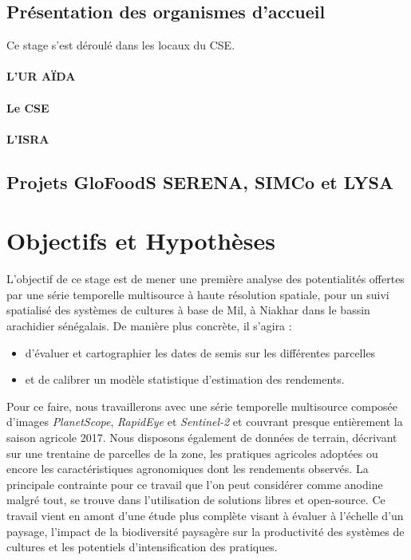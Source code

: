   \subsection{Présentation des organismes d'accueil}
Ce stage s'est déroulé dans les locaux du CSE.
    
		\paragraph{L'UR AÏDA}
		
		\paragraph{Le CSE}
    
    \paragraph{L'ISRA}
    
  
  \subsection{Projets GloFoodS SERENA, SIMCo et LYSA}

\section{Objectifs et Hypothèses}

L'objectif de ce stage est de mener une première analyse des potentialités offertes par une série temporelle multisource à haute résolution spatiale, pour un suivi spatialisé des 
systèmes de cultures à base de Mil, à Niakhar dans le bassin arachidier sénégalais. De manière plus concrète, il s'agira :
  \begin{itemize}
   \item d'évaluer et cartographier les dates de semis sur les différentes parcelles
   \item et de calibrer un modèle statistique d'estimation des rendements.
  \end{itemize}
 
\vspace{5mm} %

Pour ce faire, nous travaillerons avec une série temporelle multisource composée d'images \emph{PlanetScope}, \emph{RapidEye} et \emph{Sentinel-2} et couvrant presque entièrement 
la saison agricole 2017. Nous disposons également de données de terrain, décrivant sur une trentaine de parcelles de la zone, les pratiques agricoles adoptées ou encore les 
caractéristiques agronomiques dont les rendements observés. La principale contrainte pour ce travail que l'on peut considérer comme anodine malgré tout, se trouve dans l'utilisation 
de solutions libres et open-source. Ce travail vient en amont d'une étude plus complète visant à évaluer à l’échelle d’un paysage, l’impact de la biodiversité paysagère sur la productivité des 
systèmes de cultures et les potentiels d’intensification des pratiques.

